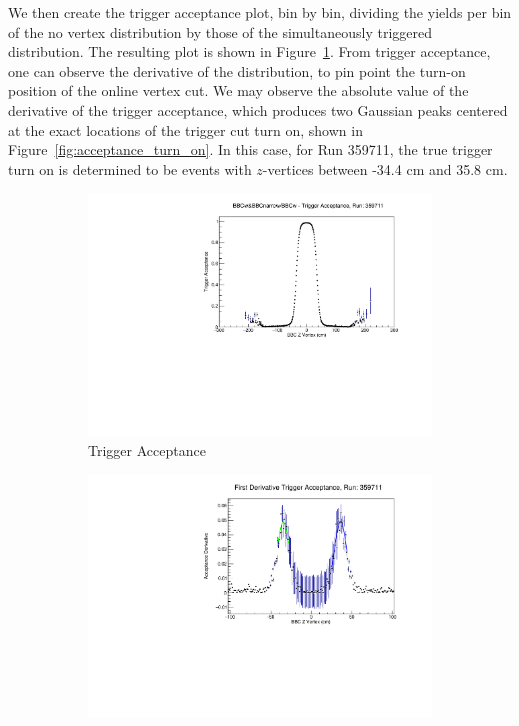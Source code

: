 We then create the trigger acceptance plot, bin by bin, dividing the yields per
bin of the no vertex distribution by those of the simultaneously triggered
distribution.  The resulting plot is shown in
Figure~\ref{fig:trigger_acceptance}.  From trigger acceptance, one can observe
the derivative of the distribution, to pin point the turn-on position of the
online vertex cut. We may observe the absolute value of the derivative of the
trigger acceptance, which produces two Gaussian peaks centered at the exact
locations of the trigger cut turn on, shown in
Figure~\ref{fig:acceptance_turn_on}. In this case, for Run 359711, the true
trigger turn on is determined to be events with $z$-vertices between -34.4 cm
and 35.8 cm.

\begin{figure}
  \centering
  \begin{subfigure}[b]{0.7\linewidth}
    \includegraphics[width=\textwidth]{./figures/trigger_acceptance_359711.pdf}
    \caption{Trigger Acceptance}
    \label{fig:trigger_acceptance}
  \end{subfigure}
  \begin{subfigure}[b]{0.7\linewidth}
    \includegraphics[width=\textwidth]{./figures/trigger_acceptance_derivative.pdf}

\end{subfigure}
\end{figure}
